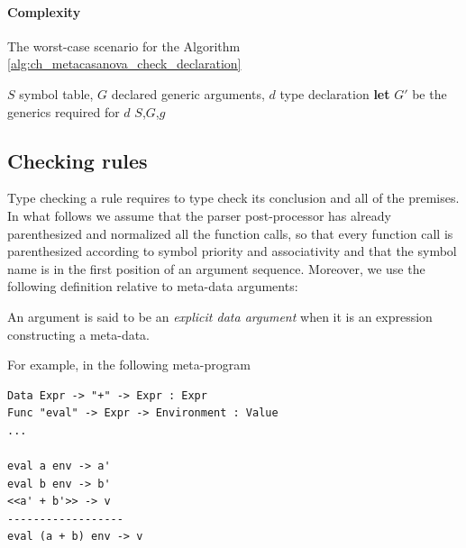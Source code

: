 \paragraph{Complexity} The worst-case scenario for the Algorithm \ref{alg:ch_metacasanova_check_declaration}
\begin{algorithm}
	\caption{Type checking of a symbol declaration}
	\label{alg:ch_metacasanova_check_declaration}
	\begin{algorithmic}
		 {$S$ symbol table, $G$ declared generic arguments, $d$ type declaration}
				\State \Return
			\Else
				\State \textbf{let} $G'$ be the generics required for $d$
					\Else
							\State {} {$S$,$G$,$g$}
						\EndFor
					\EndIf
				\Else
						\State \Return
					\Else
					\EndIf
				\EndIf
			\EndIf
		\EndFunction
	\end{algorithmic}
\end{algorithm}

\subsection{Checking rules}
Type checking a rule requires to type check its conclusion and all of the premises. In what follows we assume that the parser post-processor has already parenthesized and normalized all the function calls, so that every function call is parenthesized according to symbol priority and associativity and that the symbol name is in the first position of an argument sequence. Moreover, we use the following definition relative to meta-data arguments:

\begin{definition}
	An argument is said to be an \textit{explicit data argument} when it is an expression constructing a meta-data.
\end{definition}

\noindent
For example, in the following meta-program

\begin{lstlisting}[caption = Example of an explicit data argument in Metacasanova,  label = code:ch_metacasanova_explicit_data_argument]
Data Expr -> "+" -> Expr : Expr
Func "eval" -> Expr -> Environment : Value
...

eval a env -> a'
eval b env -> b'
<<a' + b'>> -> v
------------------
eval (a + b) env -> v
\end{lstlisting}

